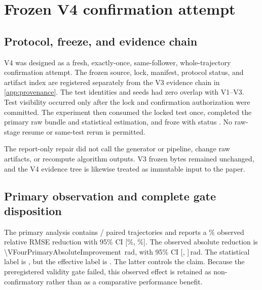 \section{Frozen V4 confirmation attempt}
\label{app:v4-confirmation}

\subsection{Protocol, freeze, and evidence chain}

V4 was designed as a fresh, exactly-once, same-follower, whole-trajectory
confirmation attempt.  The frozen source, lock, manifest, protocol status, and
artifact index are registered separately from the V3 evidence chain in
\cref{app:provenance}.  The test identities and seeds had zero overlap
with V1--V3.  Test visibility occurred only after the lock and confirmation
authorization were committed.  The experiment then consumed the locked test
once, completed the primary raw bundle and statistical estimation, and froze
with status \texttt{\VFourProtocolStatus}.  No raw-stage resume or same-test
rerun is permitted.

\begin{table}[H]
  \centering
  \caption{V4 exactly-once timeline, commits, and hashes.  The report-only
  handoff follows the complete raw confirmation and does not authorize an
  experiment rerun.}
  \label{tab:v4-evidence-chain}
  \scriptsize
  
\end{table}

The report-only repair did not call the generator or pipeline, change raw
artifacts, or recompute algorithm outputs.  V3 frozen bytes remained
unchanged, and the V4 evidence tree is likewise treated as immutable input to
the paper.

\subsection{Primary observation and complete gate disposition}

The primary analysis contains
\VFourPrimaryPairedTrajectoryCount/\VFourTestTrajectoryCount{} paired
trajectories and reports a \VFourPrimaryRelativeImprovement\% observed
relative RMSE reduction with 95\% CI
[\VFourPrimaryRelativeCILow\%, \VFourPrimaryRelativeCIHigh\%].  The observed
absolute reduction is \SI{\VFourPrimaryAbsoluteImprovement}{\radian}, with
95\% CI
[\VFourPrimaryAbsoluteCILow, \VFourPrimaryAbsoluteCIHigh]\,rad.  The
statistical label is \texttt{\VFourStatisticalClassification}, but the
effective label is \texttt{\VFourEffectiveClassification}.  The latter
controls the claim.  Because the preregistered validity gate failed, this
observed effect is retained as non-confirmatory rather than as a comparative
performance benefit.

